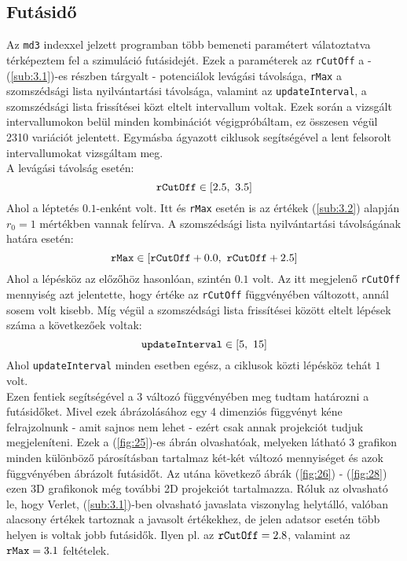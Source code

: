 \begin{multicols}{2}
\section{Futásidő} \label{sec:6}
Az \texttt{md3} indexxel jelzett programban több bemeneti paramétert válatoztatva térképeztem fel a szimuláció futásidejét. Ezek a paraméterek az \texttt{rCutOff} a - (\ref{sub:3.1})-es részben tárgyalt - potenciálok levágási távolsága, \texttt{rMax} a szomszédsági lista nyilvántartási távolsága, valamint az \texttt{updateInterval}, a szomszédsági lista frissítései közt eltelt intervallum voltak. Ezek során a vizsgált intervallumokon belül minden kombinációt végigpróbáltam, ez összesen végül 2310 variációt jelentett. Egymásba ágyazott ciklusok segítségével a lent felsorolt intervallumokat vizsgáltam meg. \\
A levágási távolság esetén:
\begin{equation}
    \text{\texttt{rCutOff}} \in \left[ 2.5,\ 3.5 \right]
\end{equation}
Ahol a léptetés $0.1$-enként volt. Itt és \texttt{rMax} esetén is az értékek (\ref{sub:3.2}) alapján $r_{0} = 1$ mértékben vannak felírva. A szomszédsági lista nyilvántartási távolságának határa esetén:
\begin{equation}
    \text{\texttt{rMax}} \in \left[ \text{\texttt{rCutOff}} + 0.0,\ \text{\texttt{rCutOff}} + 2.5 \right]
\end{equation}
Ahol a lépésköz az előzőhöz hasonlóan, szintén $0.1$ volt. Az itt megjelenő \texttt{rCutOff} mennyiség azt jelentette, hogy értéke az \texttt{rCutOff} függvényében változott, annál sosem volt kisebb. Míg végül a szomszédsági lista frissítései között eltelt lépések száma a következőek voltak:
\begin{equation}
    \text{\texttt{updateInterval}} \in \left[ 5,\ 15 \right]
\end{equation}
Ahol \texttt{updateInterval} minden esetben egész, a ciklusok közti lépésköz tehát $1$ volt. \\
Ezen fentiek segítségével a 3 változó függvényében meg tudtam határozni a futásidőket. Mivel ezek ábrázolásához egy 4 dimenziós függvényt kéne felrajzolnunk - amit sajnos nem lehet - ezért csak annak projekciót tudjuk megjeleníteni. Ezek a (\ref{fig:25})-es ábrán olvashatóak, melyeken látható 3 grafikon minden különböző párosításban tartalmaz két-két változó mennyiséget és azok függvényében ábrázolt futásidőt. Az utána következő ábrák (\ref{fig:26}) - (\ref{fig:28}) ezen 3D grafikonok még további 2D projekciót tartalmazza. Róluk az olvasható le, hogy Verlet, (\ref{sub:3.1})-ben olvasható javaslata viszonylag helytálló, valóban alacsony értékek tartoznak a javasolt értékekhez, de jelen adatsor esetén több helyen is voltak jobb futásidők. Ilyen pl. az $\text{\texttt{rCutOff}} = 2.8$, valamint az $\text{\texttt{rMax}} = 3.1$ feltételek. \\

\end{multicols}

